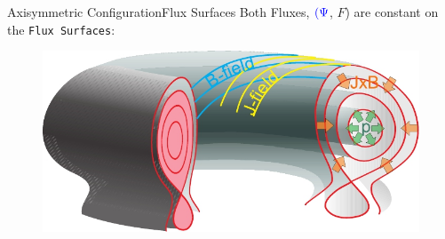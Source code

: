 \documentclass{beamer}
\begin{document}
\begin{frame}{Axisymmetric Configuration}{Flux Surfaces}
Both Fluxes, { $\color{blue} (\Psi$}, {\color{red} $F$}) are constant on the  \texttt{Flux Surfaces}:
	\begin{figure}[ht]
	\begin{center}
	\includegraphics[width=.8\columnwidth]{Tokamak_Equilibrium.jpg} %
	\end{center}
	\end{figure}
\end{frame}
\end{document}

